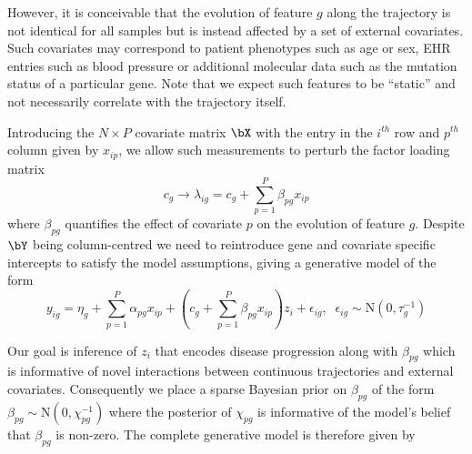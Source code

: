 However, it is conceivable that the evolution of feature $g$ along the trajectory is not identical for all samples but is instead affected by a set of external covariates. Such covariates may correspond to patient phenotypes such as age or sex, EHR entries such as blood pressure or additional molecular data such as the mutation status of a particular gene. Note that we expect such features to be ``static'' and not necessarily correlate with the trajectory itself.

Introducing the $N \times P$ covariate matrix $\bX$ with the entry in the $i^{th}$ row and $p^{th}$ column given by $x_{ip}$, we allow such measurements to perturb the factor loading matrix
\begin{equation}
	c_g \rightarrow \lambda_{ig} = c_g + \sum_{p=1}^P \beta_{pg} x_{ip}
\end{equation}
where $\beta_{pg}$ quantifies the effect of covariate $p$ on the evolution of feature $g$. Despite $\bY$ being column-centred we need to reintroduce gene and covariate specific intercepts to satisfy the model assumptions, giving a generative model of the form
\begin{equation}
	y_{ig} = \eta_g + \sum_{p=1}^P \alpha_{pg} x_{ip} + \left( c_g + \sum_{p=1}^P \beta_{pg} x_{ip}\right) z_i + \epsilon_{ig}, \; \;  \epsilon_{ig}\sim \mathrm{N}(0,\tau_g^{-1})
\end{equation}



Our goal is inference of $z_i$ that encodes disease progression along with $\beta_{pg}$ which is informative of novel interactions between continuous trajectories and external covariates. Consequently we place a sparse Bayesian prior on $\beta_{pg}$ of the form $\beta_{pg} \sim \mathrm{N}(0, \chi_{pg}^{-1})$ where the posterior of $\chi_{pg}$ is informative of the model's belief that $\beta_{pg}$ is non-zero. The complete generative model is therefore given by


